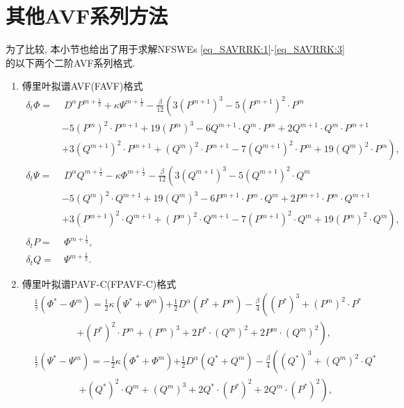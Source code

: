 \section{其他AVF系列方法}\label{Section_PAVF: 3-1}
为了比较, 本小节也给出了用于求解NFSWEs \eqref{eq_SAVRRK:1}-\eqref{eq_SAVRRK:3} 的以下两个二阶AVF系列格式.
\begin{enumerate}[$\bullet$]
\item 傅里叶拟谱AVF(FAVF)格式
\begin{align}
\delta_{t} \varPhi =&~{D^{\alpha} P^{m+\frac{1}{2}}}+\kappa \Psi^{m+\frac{1}{2}}-\frac{\beta}{12}\left(3 (P^{m+1})^3-5 (P^{m+1})^2\cdot P^{m}\right.\nonumber\\
		&-5 (P^{m})^2\cdot P^{m+1}+19 (P^{m})^3-6 Q^{m+1}\cdot Q^{m}\cdot P^{m}+2 Q^{m+1}\cdot Q^{m}\cdot P^{m+1} \nonumber\\
		&+\left. 3 (Q^{m+1})^2\cdot P^{m+1}+(Q^{m})^2\cdot P^{m+1}-7 (Q^{m+1})^2\cdot P^{m}+19 (Q^{m} )^2\cdot P^{m}\right),\label{eq_PAVF:66}\\
\delta_{t} \Psi =&~{D^{\alpha} Q^{m+\frac{1}{2}}}-\kappa \varPhi^{m+\frac{1}{2}}-\frac{\beta}{12}\left(3 (Q^{m+1})^3-5 (Q^{m+1})^2\cdot Q^{m}\right.\nonumber\\
		&-5 (Q^{m})^2\cdot Q^{m+1}+19 (Q^{m})^3-6 P^{m+1}\cdot P^{m}\cdot Q^{m}+2 P^{m+1}\cdot P^{m}\cdot Q^{m+1} \nonumber\\
		&+\left. 3 (P^{m+1})^2\cdot Q^{m+1}+(P^{m})^2\cdot Q^{m+1}-7 (P^{m+1})^2\cdot Q^{m}+19 (P^{m} )^2\cdot Q^{m}\right),\label{eq_PAVF:67}\\
\delta_{t} P=&~\varPhi^{m+\frac{1}{2}},\label{eq_PAVF:68}\\
\delta_{t} Q=&~\Psi^{m+\frac{1}{2}}.\label{eq_PAVF:69}
\end{align}
\item 傅里叶拟谱PAVF-C(FPAVF-C)格式
\begin{align}
&\frac{1}{\tau}\left(\varPhi^{*}-\varPhi^{m}\right)=\frac{1}{2}\kappa(\Psi^{*}+\Psi^{m}){+\frac{1}{2}D^{\alpha} (P^{*}+P^{m})}-\frac{\beta}{4}\left( (P^{*})^3+ (P^{m})^{2}\cdot P^{*}\right.\nonumber\\
		&~~~~~~~~~~~~~~~~~~~~\left.+ (P^{*})^{2}\cdot P^{m}+ (P^{m})^{3}+2 P^{*}\cdot (Q^{m})^{2}+2 P^{m}\cdot (Q^{m})^{2}\right),\label{eq_PAVF:90}\\
&\frac{1}{\tau}\left(\Psi^{*}-\Psi^{m}\right)=-\frac{1}{2}\kappa (\varPhi^{*}+\varPhi^{m}){+\frac{1}{2}D^{\alpha} (Q^{*}+Q^{m})}-\frac{\beta}{4}\left( (Q^{*})^3+ (Q^{m})^{2}\cdot Q^{*}\right.\nonumber\\
		&~~~~~~~~~~~~~~~~~~~~~\left.+ (Q^{*})^{2}\cdot Q^{m}+ (Q^{m})^{3}+2 Q^{*}\cdot (P^{*})^{2}+2 Q^{m}\cdot (P^{*})^{2}\right),\label{eq_PAVF:91}\\

\end{align}
\end{enumerate}
